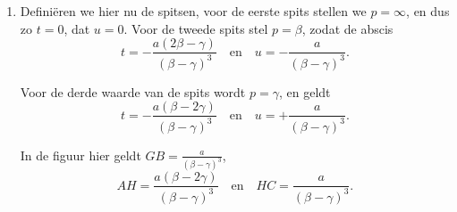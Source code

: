 \documentclass[10pt,a4paper]{article}
\newcommand{\switchenum}{\setcounter{enumi}{\arabic{enumi}-1}\switchcolumn}
\begin{document}
\begin{paracol}{2}
\begin{enumerate}[topsep=1px]
		\switchenum
		\item Definiëren we hier nu de spitsen, voor de eerste spits stellen we $p=\infty$, en dus zo $t=0$, dat $u=0$. Voor de tweede spits stel $p=\beta$, zodat de abscis
		\[
			t = -\frac{a(2\beta- \gamma)}{(\beta - \gamma)^3} \quad \text{en} \quad u = - \frac{a}{(\beta-\gamma)^3}.
		\]
		\par Voor de derde waarde van de spits wordt $p=\gamma$, en geldt 
		\[
			t = -\frac{a(\beta - 2\gamma)}{(\beta-\gamma)^3} \quad \text{en}\quad u = +\frac{a}{(\beta-\gamma)^3}.
		\]
		\par In de figuur hier geldt $GB = \frac{a}{(\beta - \gamma)^3}$,
		\[
			AH = \frac{a(\beta - 2\gamma)}{(\beta - \gamma)^3} \quad \text{en}\quad HC = \frac{a}{(\beta - \gamma)^3}.
		\]
		
		\switchcolumn*
		

\end{enumerate}
\end{paracol}
\end{document}
